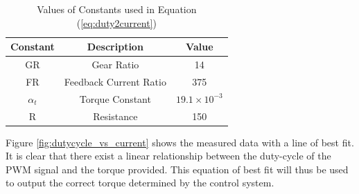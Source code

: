 \begin{table}[]
	\centering
	\begin{tabular}{|c|c|c|}
		\hline
		Constant & Description & Value \\
		\hline
		\hline
		GR &  Gear Ratio & 14 \\
		\hline
		FR & Feedback Current Ratio & 375 \\
		\hline
		$\alpha_{t}$ & Torque Constant & $19.1\times 10^{-3}$ \\
		\hline
		R & Resistance & 150 \\
		\hline
	\end{tabular}
	\caption{Values of Constants used in Equation (\ref{eq:duty2current})}
	\label{table:duty2current_constants}
\end{table}

 Figure \ref{fig:dutycycle_vs_current} shows the measured data with a line of best fit. It is clear that there exist a linear relationship between the duty-cycle of the PWM signal and the torque provided. This equation of best fit will thus be used to output the correct torque determined by the control system.

